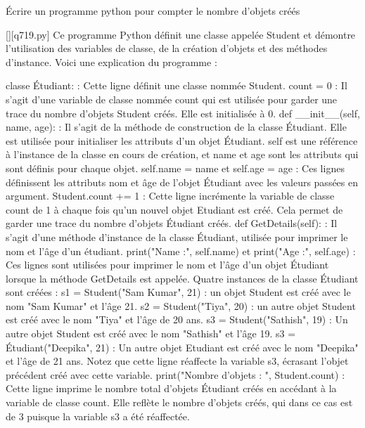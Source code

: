         \question
        Écrire un programme python pour compter le nombre d'objets créés
        \par
        \begin{solution}
            \renewcommand{\nomfichier}{q719.py}
            \pythonfile{\chemincode \nomfichier}[][\nomfichier]
            Ce programme Python définit une classe appelée Student et démontre l'utilisation des variables de classe, de la création d'objets et des méthodes d'instance. Voici une explication du programme :

    classe Étudiant: : Cette ligne définit une classe nommée Student.
    count = 0 : Il s'agit d'une variable de classe nommée count qui est utilisée pour garder une trace du nombre d'objets Student créés. Elle est initialisée à 0.
    def \_\_init\_\_(self, name, age): : Il s'agit de la méthode de construction de la classe Étudiant. Elle est utilisée pour initialiser les attributs d'un objet Étudiant. self est une référence à l'instance de la classe en cours de création, et name et age sont les attributs qui sont définis pour chaque objet.
    self.name = name et self.age = age : Ces lignes définissent les attributs nom et âge de l'objet Étudiant avec les valeurs passées en argument.
    Student.count += 1 : Cette ligne incrémente la variable de classe count de 1 à chaque fois qu'un nouvel objet Etudiant est créé. Cela permet de garder une trace du nombre d'objets Étudiant créés.
    def GetDetails(self): : Il s'agit d'une méthode d'instance de la classe Étudiant, utilisée pour imprimer le nom et l'âge d'un étudiant.
    print("Name :", self.name) et print("Age :", self.age) : Ces lignes sont utilisées pour imprimer le nom et l'âge d'un objet Étudiant lorsque la méthode GetDetails est appelée.
    Quatre instances de la classe Étudiant sont créées :
        s1 = Student("Sam Kumar", 21) : un objet Student est créé avec le nom "Sam Kumar" et l'âge 21.
        s2 = Student("Tiya", 20) : un autre objet Student est créé avec le nom "Tiya" et l'âge de 20 ans.
        s3 = Student("Sathish", 19) : Un autre objet Student est créé avec le nom "Sathish" et l'âge 19.
        s3 = Étudiant("Deepika", 21) : Un autre objet Etudiant est créé avec le nom "Deepika" et l'âge de 21 ans. Notez que cette ligne réaffecte la variable s3, écrasant l'objet précédent créé avec cette variable.
    print("Nombre d'objets : ", Student.count) : Cette ligne imprime le nombre total d'objets Étudiant créés en accédant à la variable de classe count. Elle reflète le nombre d'objets créés, qui dans ce cas est de 3 puisque la variable s3 a été réaffectée.
        \end{solution}
        

